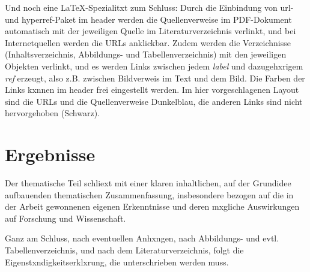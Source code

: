                 Und noch eine \LaTeX-Spezialitxt zum Schluss: Durch die Einbindung von url- und hyperref-Paket im header werden die Quellenverweise im PDF-Dokument automatisch mit der jeweiligen Quelle im Literaturverzeichnis verlinkt, und bei Internetquellen werden die URLs anklickbar. Zudem werden die Verzeichnisse (Inhaltsverzeichnis, Abbildungs- und Tabellenverzeichnis) mit den jeweiligen Objekten verlinkt, und es werden Links zwischen jedem \emph{label} und  dazugehxrigem \emph{ref} erzeugt, also z.B. zwischen Bildverweis im Text und dem Bild. Die Farben der Links kxnnen im header frei eingestellt werden. Im hier vorgeschlagenen Layout sind die URLs und die Quellenverweise Dunkelblau, die anderen Links sind nicht hervorgehoben (Schwarz). 


    \chapter{Ergebnisse}

        Der thematische Teil schliext mit einer klaren inhaltlichen, auf der Grundidee aufbauenden thematischen Zusammenfassung, insbesondere bezogen auf die in der Arbeit gewonnenen eigenen Erkenntnisse und deren mxgliche Auswirkungen auf Forschung und Wissenschaft. 

        Ganz am Schluss, nach eventuellen Anhxngen, nach Abbildungs- und evtl. Tabellenverzeichnis, und nach dem Literaturverzeichnis, folgt die Eigenstxndigkeitserklxrung, die unterschrieben werden muss.